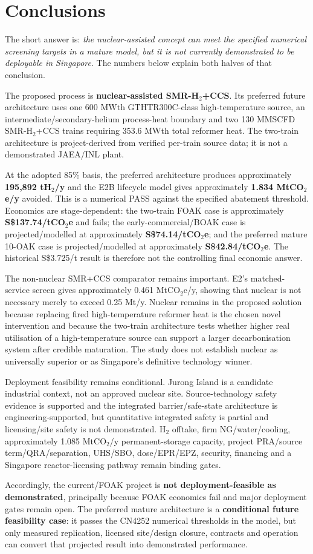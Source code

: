 \section{Conclusions}
The short answer is: \emph{the nuclear-assisted concept can meet the specified numerical screening targets in a mature model, but it is not currently demonstrated to be deployable in Singapore}. The numbers below explain both halves of that conclusion.

The proposed process is \textbf{nuclear-assisted SMR-H$_2$+CCS}. Its preferred future architecture uses one 600 MWth GTHTR300C-class high-temperature source, an intermediate/secondary-helium process-heat boundary and two 130 MMSCFD SMR-H$_2$+CCS trains requiring 353.6 MWth total reformer heat. The two-train architecture is project-derived from verified per-train source data; it is not a demonstrated JAEA/INL plant.

At the adopted 85\% basis, the preferred architecture produces approximately \textbf{195,892 tH$_2$/y} and the E2B lifecycle model gives approximately \textbf{1.834 MtCO$_2$e/y} avoided. This is a numerical PASS against the specified abatement threshold. Economics are stage-dependent: the two-train FOAK case is approximately \textbf{S\$137.74/tCO$_2$e} and fails; the early-commercial/BOAK case is projected/modelled at approximately \textbf{S\$74.14/tCO$_2$e}; and the preferred mature 10-OAK case is projected/modelled at approximately \textbf{S\$42.84/tCO$_2$e}. The historical S\$3.725/t result is therefore not the controlling final economic answer.

The non-nuclear SMR+CCS comparator remains important. E2's matched-service screen gives approximately 0.461 MtCO$_2$e/y, showing that nuclear is not necessary merely to exceed 0.25 Mt/y. Nuclear remains in the proposed solution because replacing fired high-temperature reformer heat is the chosen novel intervention and because the two-train architecture tests whether higher real utilisation of a high-temperature source can support a larger decarbonisation system after credible maturation. The study does not establish nuclear as universally superior or as Singapore's definitive technology winner.

Deployment feasibility remains conditional. Jurong Island is a candidate industrial context, not an approved nuclear site. Source-technology safety evidence is supported and the integrated barrier/safe-state architecture is engineering-supported, but quantitative integrated safety is partial and licensing/site safety is not demonstrated. H$_2$ offtake, firm NG/water/cooling, approximately 1.085 MtCO$_2$/y permanent-storage capacity, project PRA/source term/QRA/separation, UHS/SBO, dose/EPR/EPZ, security, financing and a Singapore reactor-licensing pathway remain binding gates.

Accordingly, the current/FOAK project is \textbf{not deployment-feasible as demonstrated}, principally because FOAK economics fail and major deployment gates remain open. The preferred mature architecture is a \textbf{conditional future feasibility case}: it passes the CN4252 numerical thresholds in the model, but only measured replication, licensed site/design closure, contracts and operation can convert that projected result into demonstrated performance.
